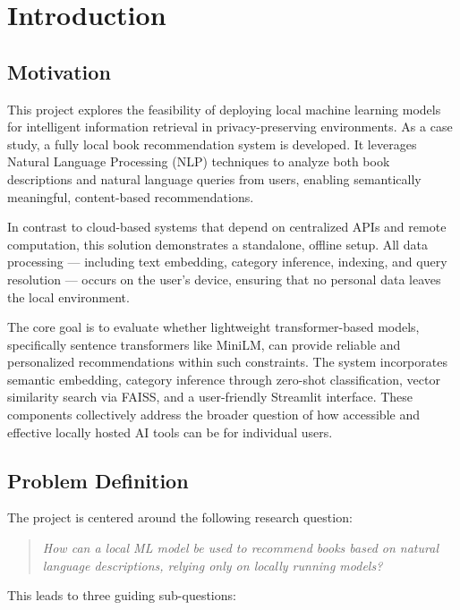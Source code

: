 \chapter{Introduction}
\label{chapter:introduction}

\section{Motivation}
\label{sec:motivation}

This project explores the feasibility of deploying local machine learning models for intelligent information retrieval in privacy-preserving environments. 
As a case study, a fully local book recommendation system is developed. 
It leverages Natural Language Processing (NLP) techniques to analyze both book descriptions and natural language queries from users, enabling semantically meaningful, content-based recommendations.

In contrast to cloud-based systems that depend on centralized APIs and remote computation, this solution demonstrates a standalone, offline setup. 
All data processing — including text embedding, category inference, indexing, and query resolution — occurs on the user’s device, ensuring that no personal data leaves the local environment.

The core goal is to evaluate whether lightweight transformer-based models, specifically sentence transformers like MiniLM, can provide reliable and personalized recommendations within such constraints. 
The system incorporates semantic embedding, category inference through zero-shot classification, vector similarity search via FAISS, and a user-friendly Streamlit interface. 
These components collectively address the broader question of how accessible and effective locally hosted AI tools can be for individual users.

\section{Problem Definition}
\label{sec:problem-definition}

The project is centered around the following research question:

\begin{quote}
\textit{How can a local ML model be used to recommend books based on natural language descriptions, relying only on locally running models?}
\end{quote}

This leads to three guiding sub-questions:

